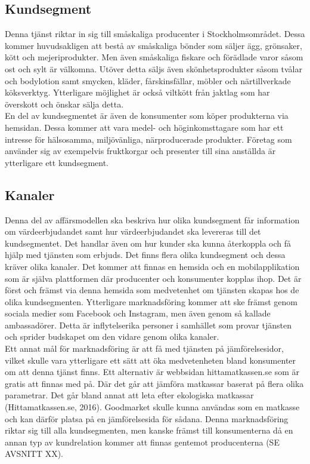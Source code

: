 \documentclass[10pt,a4paper,oneside]{article}
\begin{document}
\subsection{Kundsegment}
Denna tjänst riktar in sig till småskaliga producenter i Stockholmsområdet. Dessa kommer huvudsakligen att bestå av småskaliga bönder som säljer ägg, grönsaker, kött och mejeriprodukter. Men även småskaliga fiskare och förädlade varor såsom ost och sylt är välkomna. Utöver detta säljs även skönhetsprodukter såsom tvålar och bodylotion samt smycken, kläder, fårskinsfällar, möbler och närtillverkade köksverktyg. Ytterligare möjlighet är också viltkött från jaktlag som har överskott och önskar sälja detta. \\

En del av kundsegmentet är även de konsumenter som köper produkterna via hemsidan. Dessa kommer att vara medel- och höginkomsttagare som har ett intresse för hälsosamma, miljövänliga, närproducerade produkter. Företag som använder sig av exempelvis fruktkorgar och presenter till sina anställda är ytterligare ett kundsegment. 

\subsection{Kanaler}
Denna del av affärsmodellen ska beskriva hur olika kundsegment får information om värdeerbjudandet samt hur värdeerbjudandet ska levereras till det kundsegmentet. Det handlar även om hur kunder ska kunna återkoppla och få hjälp med tjänsten som erbjuds. Det finns flera olika kundsegment och dessa kräver olika kanaler. Det kommer att finnas en hemsida och en mobilapplikation som är själva plattformen där producenter och konsumenter kopplas ihop. Det är först och främst via denna hemsida som medvetenhet om tjänsten skapas hos de olika kundsegmenten. Ytterligare marknadsföring kommer att ske främst genom sociala medier som Facebook och Instagram, men även genom så kallade ambassadörer. Detta är inflytelserika personer i samhället som provar tjänsten och sprider budskapet om den vidare genom olika kanaler. \\

Ett annat mål för marknadsföring är att få med tjänsten på jämförelsesidor, vilket skulle vara ytterligare ett sätt att öka medvetenheten bland konsumenter om att denna tjänst finns. Ett alternativ är webbsidan hittamatkassen.se som är gratis att finnas med på. Där det går att jämföra matkassar baserat på flera olika parametrar. Det går bland annat att leta efter ekologiska matkassar (Hittamatkassen.se, 2016). Goodmarket skulle kunna användas som en matkasse och kan därför platsa på en jämförelsesida för sådana. Denna marknadsföring riktar sig till alla kundsegmenten, men kanske främst till konsumenterna då en annan typ av kundrelation kommer att finnas gentemot producenterna (SE AVSNITT XX). \\
\end{document}
